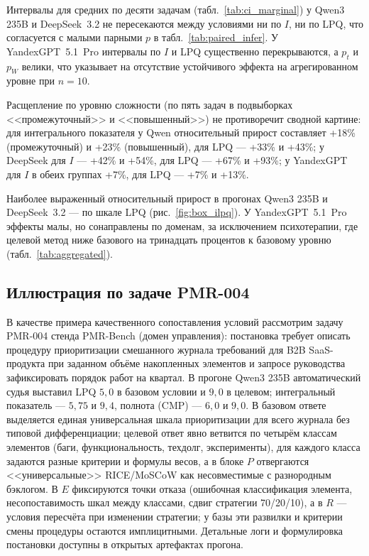 \documentclass[a4paper,12pt]{article}
\begin{document}
Интервалы для средних по десяти задачам (табл.~\ref{tab:ci_marginal}) у Qwen3 235B и DeepSeek~3.2 не пересекаются между условиями ни по $I$, ни по LPQ, что согласуется с малыми парными $p$ в табл.~\ref{tab:paired_infer}. У YandexGPT~5.1~Pro интервалы по $I$ и LPQ существенно перекрываются, а $p_t$ и $p_W$ велики, что указывает на отсутствие устойчивого эффекта на агрегированном уровне при $n=10$.

Расщепление по уровню сложности (по пять задач в подвыборках <<промежуточный>> и <<повышенный>>) не противоречит сводной картине: для интегрального показателя у Qwen относительный прирост составляет +18\% (промежуточный) и +23\% (повышенный), для LPQ --- +33\% и +43\%; у DeepSeek для $I$ --- +42\% и +54\%, для LPQ --- +67\% и +93\%; у YandexGPT для $I$ в обеих группах +7\%, для LPQ --- +7\% и +13\%.

Наиболее выраженный относительный прирост в прогонах Qwen3 235B и DeepSeek~3.2 --- по шкале LPQ (рис.~\ref{fig:box_ilpq}). У YandexGPT~5.1~Pro эффекты малы, но сонаправлены по доменам, за исключением психотерапии, где целевой метод ниже базового на тринадцать процентов к базовому уровню (табл.~\ref{tab:aggregated}).

\subsection{Иллюстрация по задаче PMR-004}

В качестве примера качественного сопоставления условий рассмотрим задачу PMR-004 стенда PMR-Bench (домен управления): постановка требует описать процедуру приоритизации смешанного журнала требований для B2B SaaS-продукта при заданном объёме накопленных элементов и запросе руководства зафиксировать порядок работ на квартал. В прогоне Qwen3 235B автоматический судья выставил LPQ $5{,}0$ в базовом условии и $9{,}0$ в целевом; интегральный показатель --- $5{,}75$ и $9{,}4$, полнота (CMP) --- $6{,}0$ и $9{,}0$. В базовом ответе выделяется единая универсальная шкала приоритизации для всего журнала без типовой дифференциации; целевой ответ явно ветвится по четырём классам элементов (баги, функциональность, техдолг, эксперименты), для каждого класса задаются разные критерии и формулы весов, а в блоке $P$ отвергаются <<универсальные>> RICE/MoSCoW как несовместимые с разнородным бэклогом. В $E$ фиксируются точки отказа (ошибочная классификация элемента, несопоставимость шкал между классами, сдвиг стратегии 70/20/10), а в $R$ --- условия пересчёта при изменении стратегии; у базы эти развилки и критерии смены процедуры остаются имплицитными. Детальные логи и формулировка постановки доступны в открытых артефактах прогона.
\end{document}
